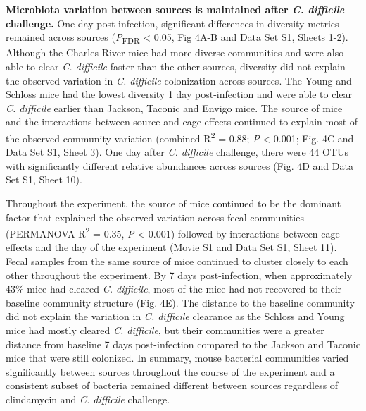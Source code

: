 \documentclass[
  11pt,
]{article}
\begin{document}
\textbf{Microbiota variation between sources is maintained after
\emph{C. difficile} challenge.} One day post-infection, significant
differences in diversity metrics remained across sources
(\emph{P}\textsubscript{FDR} \textless{} 0.05, Fig 4A-B and Data Set S1,
Sheets 1-2). Although the Charles River mice had more diverse
communities and were also able to clear \emph{C. difficile} faster than
the other sources, diversity did not explain the observed variation in
\emph{C. difficile} colonization across sources. The Young and Schloss
mice had the lowest diversity 1 day post-infection and were able to
clear \emph{C. difficile} earlier than Jackson, Taconic and Envigo mice.
The source of mice and the interactions between source and cage effects
continued to explain most of the observed community variation (combined
R\textsuperscript{2} = 0.88; \emph{P} \textless{} 0.001; Fig. 4C and
Data Set S1, Sheet 3). One day after \emph{C. difficile} challenge,
there were 44 OTUs with significantly different relative abundances
across sources (Fig. 4D and Data Set S1, Sheet 10).

Throughout the experiment, the source of mice continued to be the
dominant factor that explained the observed variation across fecal
communities (PERMANOVA R\textsuperscript{2} = 0.35, \emph{P} \textless{}
0.001) followed by interactions between cage effects and the day of the
experiment (Movie S1 and Data Set S1, Sheet 11). Fecal samples from the
same source of mice continued to cluster closely to each other
throughout the experiment. By 7 days post-infection, when approximately
43\% mice had cleared \emph{C. difficile}, most of the mice had not
recovered to their baseline community structure (Fig. 4E). The distance
to the baseline community did not explain the variation in \emph{C.
difficile} clearance as the Schloss and Young mice had mostly cleared
\emph{C. difficile}, but their communities were a greater distance from
baseline 7 days post-infection compared to the Jackson and Taconic mice
that were still colonized. In summary, mouse bacterial communities
varied significantly between sources throughout the course of the
experiment and a consistent subset of bacteria remained different
between sources regardless of clindamycin and \emph{C. difficile}
challenge.
\end{document}
